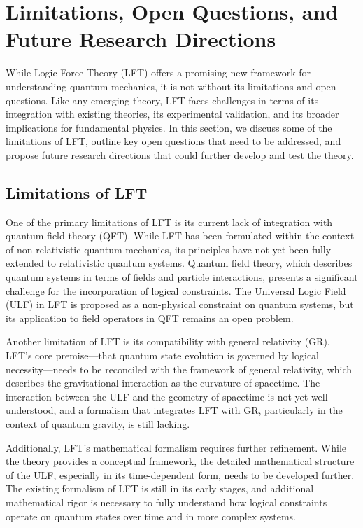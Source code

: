 \section{Limitations, Open Questions, and Future Research Directions}

While Logic Force Theory (LFT) offers a promising new framework for understanding quantum mechanics, it is not without its limitations and open questions. Like any emerging theory, LFT faces challenges in terms of its integration with existing theories, its experimental validation, and its broader implications for fundamental physics. In this section, we discuss some of the limitations of LFT, outline key open questions that need to be addressed, and propose future research directions that could further develop and test the theory.

\subsection{Limitations of LFT}

One of the primary limitations of LFT is its current lack of integration with quantum field theory (QFT). While LFT has been formulated within the context of non-relativistic quantum mechanics, its principles have not yet been fully extended to relativistic quantum systems. Quantum field theory, which describes quantum systems in terms of fields and particle interactions, presents a significant challenge for the incorporation of logical constraints. The Universal Logic Field (ULF) in LFT is proposed as a non-physical constraint on quantum systems, but its application to field operators in QFT remains an open problem.

Another limitation of LFT is its compatibility with general relativity (GR). LFT’s core premise—that quantum state evolution is governed by logical necessity—needs to be reconciled with the framework of general relativity, which describes the gravitational interaction as the curvature of spacetime. The interaction between the ULF and the geometry of spacetime is not yet well understood, and a formalism that integrates LFT with GR, particularly in the context of quantum gravity, is still lacking.

Additionally, LFT’s mathematical formalism requires further refinement. While the theory provides a conceptual framework, the detailed mathematical structure of the ULF, especially in its time-dependent form, needs to be developed further. The existing formalism of LFT is still in its early stages, and additional mathematical rigor is necessary to fully understand how logical constraints operate on quantum states over time and in more complex systems.

